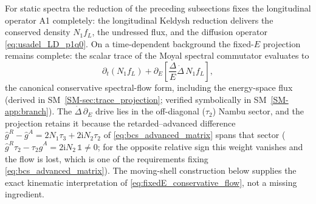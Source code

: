 \documentclass[
  aps,
  prb,
  preprint,
  superscriptaddress,
  longbibliography,
  nofootinbib
]{revtex4-2}
\newcommand{\ii}{\mathrm{i}}
\newcommand{\DOS}{N_1}
\newcommand{\fL}{f_L}
\providecommand{\openone}{}\renewcommand{\openone}{\mathds{1}}
\begin{document}
For static spectra the reduction of the preceding subsections fixes
the longitudinal operator A1 completely: the
longitudinal Keldysh reduction delivers the conserved density
\(\DOS\fL\), the undressed flux, and the diffusion operator
\cref{eq:usadel_LD_p1q0}. On a time-dependent background the fixed-\(E\)
projection remains complete: the scalar trace of the Moyal spectral
commutator evaluates to
\begin{equation}
  \partial_t(\DOS\fL)
  +
  \partial_E\!\left[
    \frac{\Delta}{E}\dot\Delta\,\DOS\fL
  \right],
  \label{eq:fixedE_conservative_flow}
\end{equation}
the canonical conservative spectral-flow form, including the energy-space
flux (derived in SM~\cref{SM-sec:trace_projection}; verified symbolically
in SM~\cref{SM-app:branch}). The
\(\dot\Delta\,\partial_E\) drive lies in the off-diagonal (\(\tau_2\))
Nambu sector, and the projection retains it because the
retarded--advanced difference
\(\hat g^R-\hat g^A=2\DOS\tau_3+2\ii N_2\tau_2\) of
\cref{eq:bcs_advanced_matrix} spans that sector
(\(\hat g^R\tau_2-\tau_2\hat g^A=2\ii N_2\,\openone\neq0\); for the
opposite relative sign this weight vanishes and the flow is lost, which is
one of the requirements fixing \cref{eq:bcs_advanced_matrix}). The
moving-shell construction below supplies
the exact kinematic interpretation of
\cref{eq:fixedE_conservative_flow}, not a missing ingredient.
\end{document}

